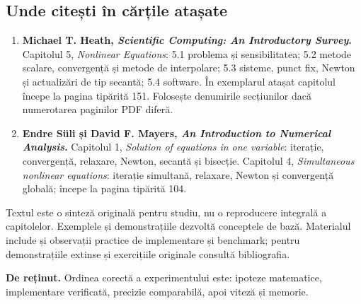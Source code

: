\documentclass[11pt,a4paper]{article}
\newcommand{\important}[1]{\par\smallskip\textbf{De reținut.} #1\par\smallskip}
\begin{document}
\subsection{Unde citești în cărțile atașate}
\begin{enumerate}
\item \textbf{Michael T. Heath, \emph{Scientific Computing: An Introductory Survey}.} Capitolul 5, \emph{Nonlinear Equations}: 5.1 problema și sensibilitatea; 5.2 metode scalare, convergență și metode de interpolare; 5.3 sisteme, punct fix, Newton și actualizări de tip secantă; 5.4 software. În exemplarul atașat capitolul începe la pagina tipărită 151. Folosește denumirile secțiunilor dacă numerotarea paginilor PDF diferă.
\item \textbf{Endre Süli și David F. Mayers, \emph{An Introduction to Numerical Analysis}.} Capitolul 1, \emph{Solution of equations in one variable}: iterație, convergență, relaxare, Newton, secantă și bisecție. Capitolul 4, \emph{Simultaneous nonlinear equations}: iterație simultană, relaxare, Newton și convergență globală; începe la pagina tipărită 104.
\end{enumerate}
Textul este o sinteză originală pentru studiu, nu o reproducere integrală a capitolelor. Exemplele și demonstrațiile dezvoltă conceptele de bază. Materialul include și observații practice de implementare și benchmark; pentru demonstrațiile extinse și exercițiile originale consultă bibliografia.

\important{Ordinea corectă a experimentului este: ipoteze matematice, implementare verificată, precizie comparabilă, apoi viteză și memorie.}
\end{document}
